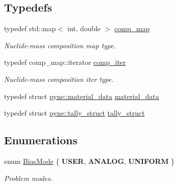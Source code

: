 \subsection*{Typedefs}
\begin{DoxyCompactItemize}
\item 
\mbox{\label{namespacepyne_a86738cecccf4ce3f4ecc2ff6f45ce1a2}} 
typedef std\+::map$<$ int, double $>$ \hyperlink{namespacepyne_a86738cecccf4ce3f4ecc2ff6f45ce1a2}{comp\+\_\+map}
\begin{DoxyCompactList}\small\item\em Nuclide-\/mass composition map type. \end{DoxyCompactList}\item 
\mbox{\label{namespacepyne_af38f60eec2c4c80e6decc75c3b21a879}} 
typedef comp\+\_\+map\+::iterator \hyperlink{namespacepyne_af38f60eec2c4c80e6decc75c3b21a879}{comp\+\_\+iter}
\begin{DoxyCompactList}\small\item\em Nuclide-\/mass composition iter type. \end{DoxyCompactList}\item 
typedef struct \hyperlink{structpyne_1_1material__data}{pyne\+::material\+\_\+data} \hyperlink{namespacepyne_a30fee8818307aa6d8d45dc33ddee6008}{material\+\_\+data}
\item 
typedef struct \hyperlink{structpyne_1_1tally__struct}{pyne\+::tally\+\_\+struct} \hyperlink{namespacepyne_a50f65e8f1e109c362c1cd737d0627941}{tally\+\_\+struct}
\end{DoxyCompactItemize}
\subsection*{Enumerations}
\begin{DoxyCompactItemize}
\item 
\mbox{\label{namespacepyne_af75379f8cb942a7e996031ee50115fb5}} 
enum \hyperlink{namespacepyne_af75379f8cb942a7e996031ee50115fb5}{Bias\+Mode} \{ {\bfseries U\+S\+ER}, 
{\bfseries A\+N\+A\+L\+OG}, 
{\bfseries U\+N\+I\+F\+O\+RM}
 \}\begin{DoxyCompactList}\small\item\em Problem modes. \end{DoxyCompactList}
\end{DoxyCompactItemize}
